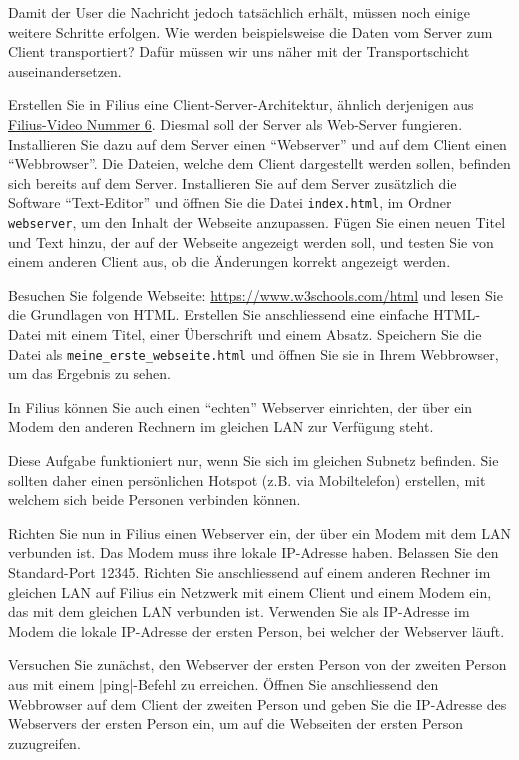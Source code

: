 Damit der User die Nachricht jedoch tatsächlich erhält, müssen noch einige weitere Schritte erfolgen. Wie werden beispielsweise die Daten vom Server zum Client transportiert? Dafür müssen wir uns näher mit der Transportschicht auseinandersetzen.

\begin{myexercise}
	Erstellen Sie in Filius eine Client-Server-Architektur, ähnlich derjenigen aus \href{https://www.youtube.com/watch?v=Kn8v_HrckUM&list=PLUfZiVdJui-57k0VcRecHX0JTEhOMgiKP}{Filius-Video Nummer 6}. Diesmal soll der Server als Web-Server fungieren. Installieren Sie dazu auf dem Server einen \enquote{Webserver} und auf dem Client einen \enquote{Webbrowser}. Die Dateien, welche dem Client dargestellt werden sollen, befinden sich bereits auf dem Server. Installieren Sie auf dem Server zusätzlich die Software \enquote{Text-Editor} und öffnen Sie die Datei \texttt{index.html}, im Ordner \texttt{webserver}, um den Inhalt der Webseite anzupassen. Fügen Sie einen neuen Titel und Text hinzu, der auf der Webseite angezeigt werden soll, und testen Sie von einem anderen Client aus, ob die Änderungen korrekt angezeigt werden.
\end{myexercise}

\begin{mychallenge}
	Besuchen Sie folgende Webseite: \url{https://www.w3schools.com/html} und lesen Sie die Grundlagen von \gls{HTML}. Erstellen Sie anschliessend eine einfache \gls{HTML}-Datei mit einem Titel, einer Überschrift und einem Absatz. Speichern Sie die Datei als \texttt{meine\_erste\_webseite.html} und öffnen Sie sie in Ihrem Webbrowser, um das Ergebnis zu sehen.
\end{mychallenge}

\begin{mychallenge}
	In Filius können Sie auch einen ``echten'' Webserver einrichten, der über ein Modem den anderen Rechnern im gleichen \gls{LAN} zur Verfügung steht. 
	
	Diese Aufgabe funktioniert nur, wenn Sie sich im gleichen Subnetz befinden. Sie sollten daher einen persönlichen Hotspot (z.B. via Mobiltelefon) erstellen, mit welchem sich beide Personen verbinden können.
	
	Richten Sie nun in Filius einen Webserver ein, der über ein Modem mit dem \gls{LAN} verbunden ist. Das Modem muss ihre lokale IP-Adresse haben. Belassen Sie den Standard-Port 12345. Richten Sie anschliessend auf einem anderen Rechner im gleichen \gls{LAN} auf Filius ein Netzwerk mit einem Client und einem Modem ein, das mit dem gleichen \gls{LAN} verbunden ist. Verwenden Sie als IP-Adresse im Modem die lokale IP-Adresse der ersten Person, bei welcher der Webserver läuft.

	Versuchen Sie zunächst, den Webserver der ersten Person von der zweiten Person aus mit einem \commandbox*|ping|-Befehl zu erreichen. Öffnen Sie anschliessend den Webbrowser auf dem Client der zweiten Person und geben Sie die IP-Adresse des Webservers der ersten Person ein, um auf die Webseiten der ersten Person zuzugreifen.
\end{mychallenge}

